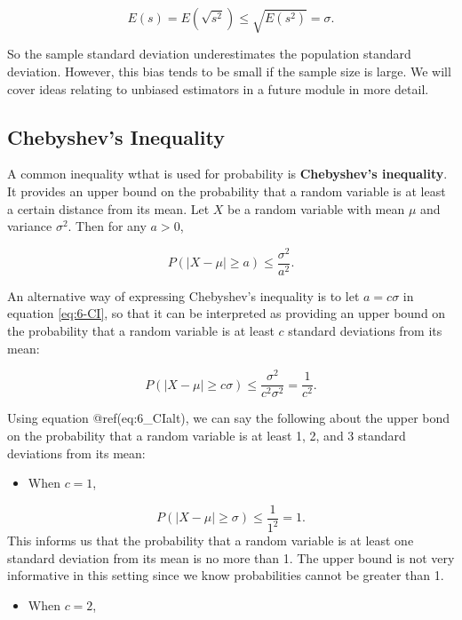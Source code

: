 \documentclass[
]{book}
\providecommand{\tightlist}{%
  \setlength{\itemsep}{0pt}\setlength{\parskip}{0pt}}
\begin{document}
\[
E(s) = E(\sqrt{s^2}) \leq \sqrt{E(s^2)} = \sigma.
\]

So the sample standard deviation underestimates the population standard deviation. However, this bias tends to be small if the sample size is large. We will cover ideas relating to unbiased estimators in a future module in more detail.

\subsection{Chebyshev's Inequality}\label{chebyshevs-inequality}

A common inequality wthat is used for probability is \textbf{Chebyshev's inequality}. It provides an upper bound on the probability that a random variable is at least a certain distance from its mean. Let \(X\) be a random variable with mean \(\mu\) and variance \(\sigma^2\). Then for any \(a>0\),

\begin{equation} 
P(|X-\mu| \geq a) \leq \frac{\sigma^2}{a^2}.
\label{eq:6-CI}
\end{equation}

An alternative way of expressing Chebyshev's inequality is to let \(a = c \sigma\) in equation \eqref{eq:6-CI}, so that it can be interpreted as providing an upper bound on the probability that a random variable is at least \(c\) standard deviations from its mean:

\begin{equation} 
P(|X-\mu| \geq c \sigma) \leq \frac{\sigma^2}{c^2 \sigma^2} = \frac{1}{c^2}.
\label{eq:6-CIalt}
\end{equation}

Using equation @ref(eq:6\_CIalt), we can say the following about the upper bond on the probability that a random variable is at least 1, 2, and 3 standard deviations from its mean:

\begin{itemize}
\tightlist
\item
  When \(c=1\),
\end{itemize}

\[
P(|X-\mu| \geq \sigma) \leq \frac{1}{1^2} = 1.
\]
This informs us that the probability that a random variable is at least one standard deviation from its mean is no more than 1. The upper bound is not very informative in this setting since we know probabilities cannot be greater than 1.

\begin{itemize}
\tightlist
\item
  When \(c=2\),
\end{itemize}
\end{document}
